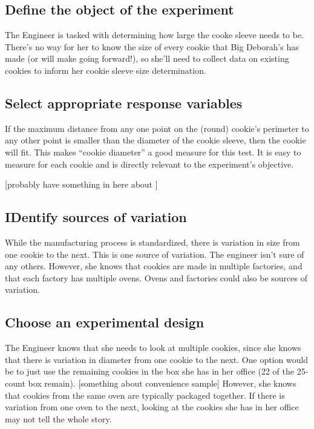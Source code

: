 \documentclass[]{book}
\theoremstyle{definition}
\theoremstyle{definition}
\theoremstyle{definition}
\theoremstyle{remark}
\begin{document}
\subsection{Define the object of the
experiment}\label{define-the-object-of-the-experiment}

The Engineer is tasked with determining how large the cooke sleeve needs
to be. There's no way for her to know the size of every cookie that Big
Deborah's has made (or will make going forward!), so she'll need to
collect data on existing cookies to inform her cookie sleeve size
determination.

\subsection{Select appropriate response
variables}\label{select-appropriate-response-variables}

If the maximum distance from any one point on the (round) cookie's
perimeter to any other point is smaller than the diameter of the cookie
sleeve, then the cookie will fit. This makes ``cookie diameter'' a good
measure for this test. It is easy to measure for each cookie and is
directly relevant to the experiment's objective.

{[}probably have something in here about {]}

\subsection{IDentify sources of
variation}\label{identify-sources-of-variation}

While the manufacturing process is standardized, there is variation in
size from one cookie to the next. This is one source of variation. The
engineer isn't sure of any others. However, she knows that cookies are
made in multiple factories, and that each factory has multiple ovens.
Ovens and factories could also be sources of variation.

\subsection{Choose an experimental
design}\label{choose-an-experimental-design-2}

The Engineer knows that she needs to look at multiple cookies, since she
knows that there is variation in diameter from one cookie to the next.
One option would be to just use the remaining cookies in the box she has
in her office (22 of the 25-count box remain). {[}something about
convenience sample{]} However, she knows that cookies from the same oven
are typically packaged together. If there is variation from one oven to
the next, looking at the cookies she has in her office may not tell the
whole story.
\end{document}
